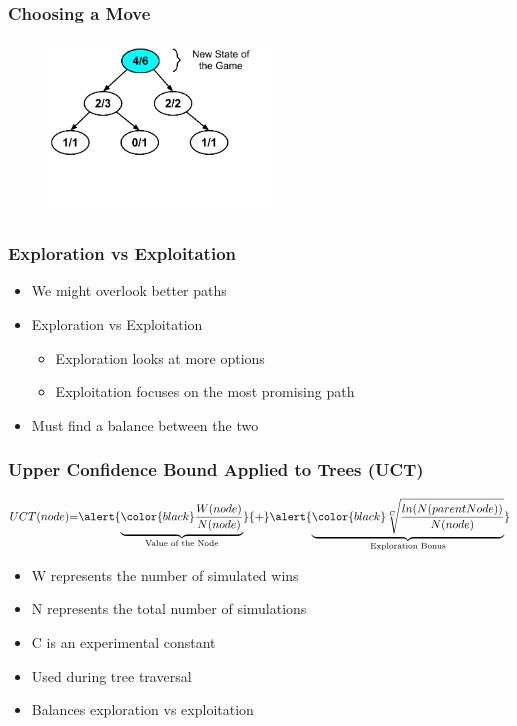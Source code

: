 \documentclass{beamer}
\begin{document}
\begin{frame}[fragile]
\frametitle{Choosing a Move}
\begin{figure}[h]
	\includegraphics[width=6cm]{Diagrams/MakeAMove/MakeAMoveThree.pdf}
	\centering
\end{figure}
\end{frame}

\begin{frame}
\frametitle{Exploration vs Exploitation}
\begin{itemize}
	\item We might overlook better paths
	\item Exploration vs Exploitation
	\begin{itemize}
		\item Exploration looks at more options
		\item Exploitation focuses on the most promising path
	\end{itemize}
	\item Must find a balance between the two
\end{itemize}
\end{frame}

\begin{frame}[fragile]
\frametitle{Upper Confidence Bound Applied to Trees (UCT)}
\[
	UCT(node)
	{=}
	\alert{\underbrace{\color{black} \frac{W(node)}{N(node)}}_
		{{\text{Value of the Node}}}}
	{+}
	\alert{\underbrace{\color{black} \sqrt[C]{\frac{ln(N(parentNode))}{N(node)}}}_
		{\text{Exploration Bonus}}}
\]
\begin{itemize}
	\item W represents the number of simulated wins
	\item N represents the total number of simulations
	\item C is an experimental constant
	\item Used during tree traversal
	\item Balances exploration vs exploitation
\end{itemize}
\end{frame}
\end{document}
